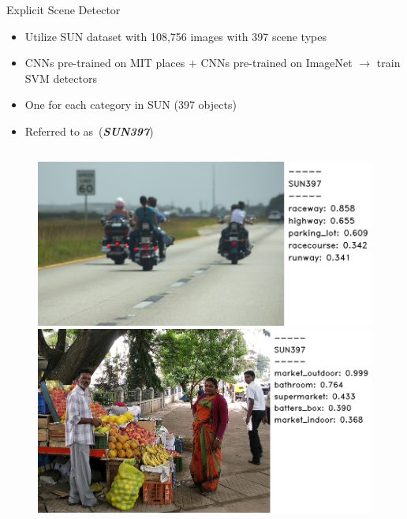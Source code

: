 \documentclass{beamer}
\begin{document}
\begin{frame}{Explicit Scene Detector}
    \begin{itemize}
        \item Utilize SUN dataset with 108,756 images with 397 scene types 
        \item \small{CNNs pre-trained on MIT places} $+$ \small{CNNs pre-trained on ImageNet} $\rightarrow$ train SVM detectors 
        \item One for each category in SUN (397 objects) 
        \item Referred to as~(\textbf{\emph{SUN397}})  
    \end{itemize}
  \begin{figure}[h]
    \begin{columns}
    \centering
    \includegraphics[width=1.0\textwidth]{images/503790.png}
    \hspace{-5mm}
    \centering
    \includegraphics[width=1.0\textwidth]{images/69356.png}
    \end{columns}
  \end{figure}
\end{frame}
\end{document}
